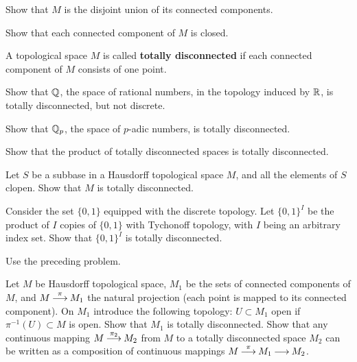 \documentclass[12pt]{article}
\begin{document}
\begin{zadacha}
Show that $M$ is the disjoint union of its connected components.
\end{zadacha}

\begin{zadacha}
Show that each connected component of $M$ is closed.
\end{zadacha}


\begin{opredelenie}
A topological space
$M$ is called {\bf totally disconnected}
if each connected component of $M$ consists of one point.
\end{opredelenie}

\begin{zadacha}
Show that ${\mathbb Q}$, the space of rational numbers, 
in the topology induced by ${\mathbb R}$, is totally disconnected,
but not discrete.
\end{zadacha}

\begin{zadacha}[*]
Show that ${\mathbb Q}_p$, the space of $p$-adic numbers, is totally disconnected.
\end{zadacha}

\begin{zadacha}[*]
Show that the product of totally disconnected spaces is totally disconnected.
\end{zadacha}

\begin{zadacha} 
Let $S$ be a subbase in a Hausdorff topological space $M$, and all the
elements of $S$ clopen. Show that $M$ is totally disconnected. 
\end{zadacha}

\begin{zadacha}[!]
Consider the set $\{0, 1\}$ equipped with the discrete topology.
Let $\{0, 1\}^I$ be the product of 
$I$ copies of  $\{0, 1\}$ with Tychonoff topology, 
with $I$ being an arbitrary index set.
Show that $\{0, 1\}^I$ is totally disconnected.
\end{zadacha}

\begin{ukazanie}
Use the preceding problem.
\end{ukazanie}

\begin{zadacha}[*]
Let $M$ be Hausdorff topological space, 
$M_1$ be the sets of connected components of $M$, and
$M\overset{\pi}{{\:\longrightarrow\:}} M_1$ the natural projection (each point
is mapped to its connected component).
On $M_1$ introduce the following topology:
$U\subset M_1$ open if $\pi^{-1}(U) \subset M$ is open.
Show that $M_1$ is totally disconnected.
Show that any continuous mapping
$M\overset{\pi_2}{{\:\longrightarrow\:}} M_2$
from $M$ to a totally disconnected space $M_2$
can be written as a composition of continuous mappings
$M\overset{\pi}{{\:\longrightarrow\:}} M_1 {\:\longrightarrow\:}  M_2$.
\end{zadacha}
\end{document}
